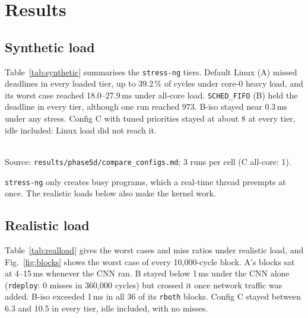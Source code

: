 \section{Results}
\label{sec:results}

\subsection{Synthetic load}
Table~\ref{tab:synthetic} summarises the \texttt{stress-ng} tiers. Default Linux (A) missed deadlines in every loaded tier, up to 39.2\,\% of cycles under core-0 heavy load, and its worst case reached 18.0--27.9\,ms under all-core load. \texttt{SCHED\_FIFO} (B) held the deadline in every tier, although one run reached 973\us{}. B-iso stayed near 0.3\,ms under any stress. Config C with tuned priorities stayed at about 8\us{} at every tier, idle included: Linux load did not reach it.

\begin{table}[t]
\centering
\caption{Worst-case lateness under \texttt{stress-ng} (µs, mean of runs; DMR = highest miss ratio of any run)}
\label{tab:synthetic}
\small
\setlength{\tabcolsep}{3.5pt}
\\[2pt]\footnotesize Source: \texttt{results/phase5d/compare\_configs.md}; 3 runs per cell (C all-core: 1).
\end{table}

\texttt{stress-ng} only creates busy programs, which a real-time thread preempts at once. The realistic loads below also make the kernel work.

\subsection{Realistic load}
Table~\ref{tab:realload} gives the worst cases and miss ratios under realistic load, and Fig.~\ref{fig:blocks} shows the worst case of every 10{,}000-cycle block. A's blocks sat at 4--15\,ms whenever the CNN ran. B stayed below 1\,ms under the CNN alone (\texttt{rdeploy}: 0 misses in 360{,}000 cycles) but crossed it once network traffic was added. B-iso exceeded 1\,ms in all 36 of its \texttt{rboth} blocks. Config C stayed between 6.3 and 10.5\us{} in every tier, idle included, with no misses.

